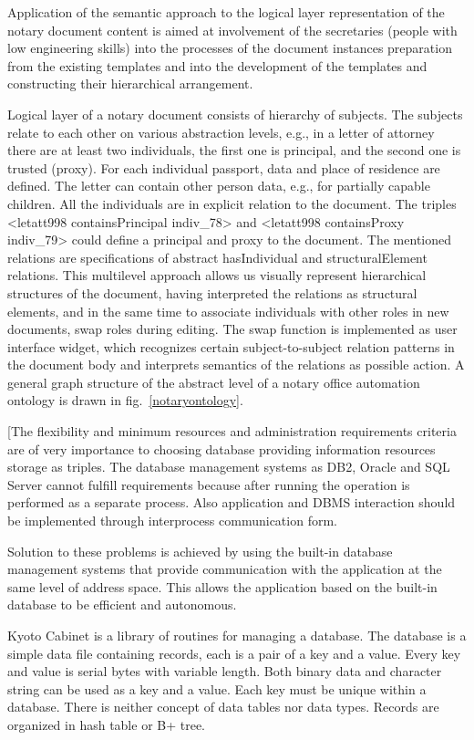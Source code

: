 \documentclass[conference]{IEEEtran}
\begin{document}
{{Application of the semantic approach to the logical layer representation of the notary document content is aimed at involvement of the secretaries (people with low engineering skills) into the processes of the document instances preparation from the existing templates and into the development of the templates and constructing their hierarchical arrangement.

Logical layer of a notary document consists of hierarchy of subjects. The subjects relate to each other on various abstraction levels, e.g., in a letter of attorney there are at least two individuals, the first one is principal, and the second one is trusted (proxy). For each individual passport, data and place of residence are defined. The letter can contain other person data, e.g., for partially capable children. All the individuals are in explicit relation to the document. The triples <letatt998 containsPrincipal indiv\_78> and <letatt998 containsProxy indiv\_79> could define a principal and proxy to the document. The mentioned relations are specifications of abstract hasIndividual and structuralElement relations. This multilevel approach allows us visually represent hierarchical structures of the document, having interpreted the relations as structural elements, and in the same time to associate individuals with other roles in new documents, swap roles during editing. The swap function is implemented as user interface widget, which recognizes certain subject-to-subject relation patterns in the document body and interprets semantics of the relations as possible action. A general graph structure of the abstract level of a notary office automation ontology is drawn in fig.~\ref{notaryontology}.

[The flexibility and minimum resources and administration requirements criteria are of very importance to choosing database providing information resources storage as triples. The database management systems as DB2, Oracle and SQL Server cannot fulfill requirements because after running the operation is performed as a separate process. Also application and DBMS interaction should be implemented through interprocess communication form.

Solution to these problems is achieved by using the built-in database management systems that provide communication with the application at the same level of address space. This allows the application based on the built-in database to be efficient and autonomous.

Kyoto Cabinet is a library of routines for managing a database. The database is a simple data file containing records, each is a pair of a key and a value. Every key and value is serial bytes with variable length. Both binary data and character string can be used as a key and a value. Each key must be unique within a database. There is neither concept of data tables nor data types. Records are organized in hash table or B+ tree. \cite{b1}

}}
\end{document}
